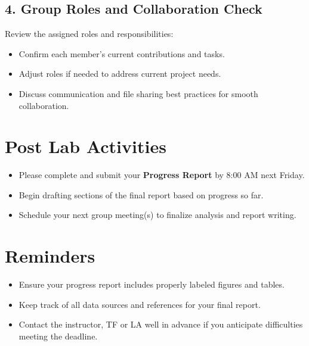 \documentclass[12pt]{article}
\begin{document}
\vspace{2\baselineskip}

\subsection*{4. Group Roles and Collaboration Check}
Review the assigned roles and responsibilities:  
\begin{itemize}
    \item Confirm each member’s current contributions and tasks.  
    \item Adjust roles if needed to address current project needs.  
    \item Discuss communication and file sharing best practices for smooth collaboration.  
\end{itemize}

\vspace{2\baselineskip}


\section*{Post Lab Activities}

\begin{itemize}
    \item Please complete and submit your \textbf{Progress Report} by 8:00 AM next Friday.
    \item Begin drafting sections of the final report based on progress so far.  
    \item Schedule your next group meeting(s) to finalize analysis and report writing.  
\end{itemize}

\section*{Reminders}

\begin{itemize}
    \item Ensure your progress report includes properly labeled figures and tables.  
    \item Keep track of all data sources and references for your final report.  
    \item Contact the instructor, TF or LA well in advance if you anticipate difficulties meeting the deadline.  
\end{itemize}
\end{document}
